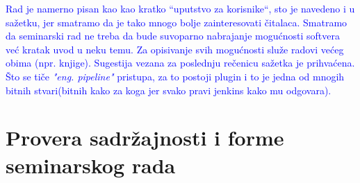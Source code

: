 \documentclass[a4paper]{report}
\newcommand{\odgovor}[1]{\textcolor{blue}{#1}}
\begin{document}
\odgovor{Rad je namerno pisan kao kao kratko ``uputstvo za korisnike``, sto je navedeno i u sažetku, jer smatramo da je tako mnogo bolje zainteresovati čitalaca. Smatramo da seminarski rad ne treba da bude suvoparno nabrajanje mogućnosti softvera već kratak uvod u neku temu. Za opisivanje svih mogućnosti služe radovi većeg obima (npr. knjige). Sugestija vezana za poslednju rečenicu sažetka je prihvaćena. Što se tiče \textit{"eng. pipeline"} pristupa, za to postoji plugin i to je jedna od mnogih bitnih stvari(bitnih kako za koga jer svako pravi jenkins kako mu odgovara).}


\section{Provera sadržajnosti i forme seminarskog rada}
\end{document}
